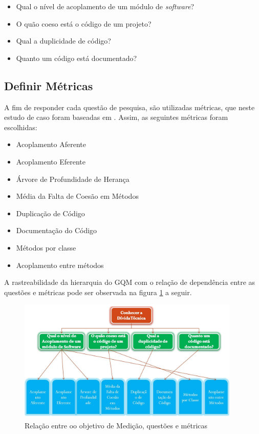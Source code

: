 \begin{itemize}
  \item Qual o nível de acoplamento de um módulo de \textit{software}?
  \item O quão coeso está o código de um projeto?
  \item Qual a duplicidade de código?
  \item Quanto um código está documentado?
\end{itemize}

\subsection{Definir Métricas}
A fim de responder cada questão de pesquisa, são utilizadas métricas, que neste
estudo de caso foram baseadas em \cite{siebra}. Assim, as seguintes métricas
foram escolhidas:

\begin{itemize}
  \item Acoplamento Aferente
  \item Acoplamento Eferente
  \item Árvore de Profundidade de Herança
  \item Média da Falta de Coesão em Métodos
  \item Duplicação de Código
  \item Documentação do Código
  \item Métodos por classe
  \item Acoplamento entre métodos
\end{itemize}

A rastreabilidade da hierarquia do GQM com o relação de dependência entre as questões
e métricas pode ser observada na figura \ref{fig:arvore} a seguir.

\begin{figure}[h]
  \centering
  \includegraphics[width=400px, scale=1]{figuras/arvore}
  \caption{Relação entre oo objetivo de Medição, questões e métricas}
  \label{fig:arvore}
\end{figure}
